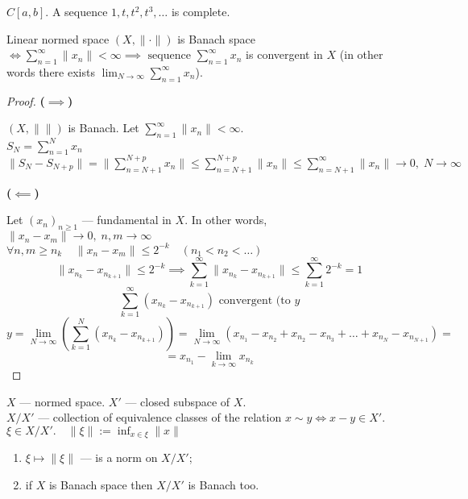 \begin{example}
  $C[a,b]$. A sequence $1, t, t^2, t ^{3}, \ldots$ is complete.
\end{example}

\hr

\begin{lemma}
  Linear normed space $(X, \| \cdot\|)$ is Banach space $\iff \sum_{n=1}^{\infty} \|x_n\| < \infty \implies \text{ sequence } \sum_{n=1}^{\infty} x_n$ is convergent in $X$ (in other words there exists $\lim_{N \to \infty} \sum_{n=1}^{\infty} x_n$).
\end{lemma}

\begin{proof}
  \textbf{($\implies$)}

  $(X,\|\|)$ is Banach. Let $\sum_{n=1}^{\infty} \|x_n\| < \infty$.\\
  $S_N = \sum_{n=1}^{N} x_n$ \\
  $\|S_{N} - S_{N+p}\| = \|\sum_{n=N+1}^{N+p} x_n\| \le  \sum_{n=N+1}^{N+p} \|x_n\| \le  \sum_{n=N+1}^{\infty} \|x_n\| \to 0, \; N \to  \infty$ 

  \textbf{($\impliedby$)}

  Let $(x_n)_{n \ge 1}$ --- fundamental in $X$. In other words, $\|x_n - x_m\| \to  0, \; n,m \to  \infty$\\
$\forall n,m \ge  n_k \;\;\;\; \|x_n - x_m\| \le  2^{-k} \quad (n_1 < n_2 < \ldots)$\\
\[ \|x_{n_k} - x_{n_{k+1}}\| \le  2^{-k} \implies \sum_{k=1}^{\infty} \|x_{n_{k}} - x_{n_{k+1}}\|  \le  \sum_{k=1}^{\infty} 2^{-k} = 1\] 
\[ \sum_{k=1}^{\infty} \left( x_{n_{k}} - x_{n_{k+1}} \right) \text{ convergent (to $y$} \] 
\[ y=\lim_{N \to \infty} \left( \sum_{k=1}^{N} \left( x_{n_{k}} - x_{n_{k+1}} \right)  \right) = \lim_{N \to \infty} \left( x_{n_1} - x_{n_2} + x_{n_2} - x_{n_3} + \ldots + x_{n_{N}} - x_{n_{N+1}} \right) =\] 
\[ =  x_{n_1} - \lim_{k \to \infty} x_{n_{k}}  \] 
\end{proof}

$X$ --- normed space. $X'$ --- closed subspace of $X$.\\
$X / X'$ --- collection of equivalence classes of the relation $x \sim y \iff x - y \in  X'$.\\

$\xi \in  X / X'. \quad \|\xi\| := \inf_{x \in  \xi} \|x\|$\\

\begin{theorem}
  \begin{enumerate}
    \item $\xi \mapsto  \|\xi\|$ --- is a norm on $X / X'$;
    \item  if  $X$ is Banach space then $X / X'$ is Banach too.
  \end{enumerate}
\end{theorem}


